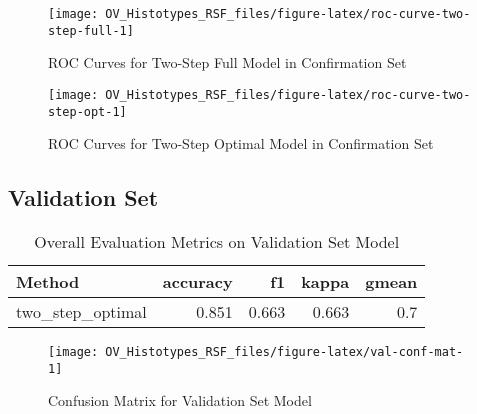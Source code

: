 \documentclass[
]{report}
\begin{document}
\begin{figure}[H]

{\centering \texttt{[image: OV\_Histotypes\_RSF\_files/figure-latex/roc-curve-two-step-full-1]} 

}

\caption{ROC Curves for Two-Step Full Model in Confirmation Set}\label{fig:roc-curve-two-step-full}
\end{figure}

\begin{figure}[H]

{\centering \texttt{[image: OV\_Histotypes\_RSF\_files/figure-latex/roc-curve-two-step-opt-1]} 

}

\caption{ROC Curves for Two-Step Optimal Model in Confirmation Set}\label{fig:roc-curve-two-step-opt}
\end{figure}

\hypertarget{validation-set}{%
\subsection{Validation Set}\label{validation-set}}

\begin{table}

\caption{\label{tab:val-eval-overall}Overall Evaluation Metrics on Validation Set Model}
\centering
\begin{tabular}[t]{l|r|r|r|r}
\hline
Method & accuracy & f1 & kappa & gmean\\
\hline
two\_step\_optimal & 0.851 & 0.663 & 0.663 & 0.7\\
\hline
\end{tabular}
\end{table}

\begin{figure}[H]

{\centering \texttt{[image: OV\_Histotypes\_RSF\_files/figure-latex/val-conf-mat-1]} 

}

\caption{Confusion Matrix for Validation Set Model}\label{fig:val-conf-mat}
\end{figure}
\end{document}
